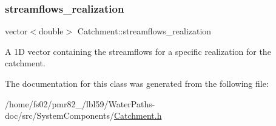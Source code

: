 \subsubsection{\texorpdfstring{streamflows\+\_\+realization}{streamflows\_realization}}
{\footnotesize\ttfamily vector$<$double$>$ Catchment\+::streamflows\+\_\+realization\hspace{0.3cm}{\ttfamily [protected]}}



A 1D vector containing the streamflows for a specific realization for the catchment. 



The documentation for this class was generated from the following file\+:\begin{DoxyCompactItemize}
\item 
/home/fs02/pmr82\+\_/lbl59/\+Water\+Paths-\/doc/src/\+System\+Components/\mbox{\hyperlink{Catchment_8h}{Catchment.\+h}}\end{DoxyCompactItemize}
